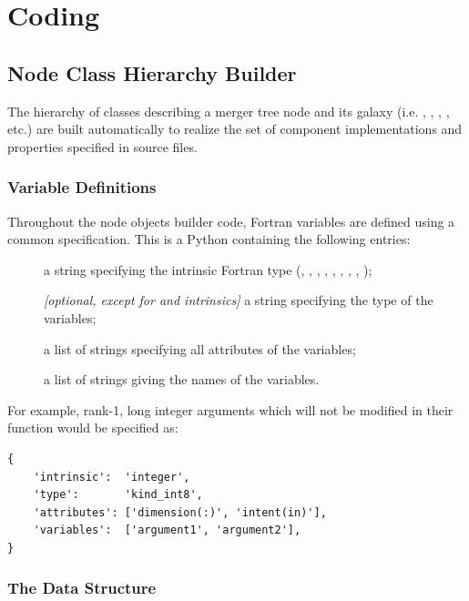 \chapter{Coding \glc}\label{sec:coding}

\section{Node Class Hierarchy Builder}

The hierarchy of classes describing a merger tree node and its galaxy (i.e. , , , , etc.) are built automatically to realize the set of component implementations and properties specified in source files.

\subsection{Variable Definitions}\label{sec:nodeBuilderVariableDefinitions}

Throughout the node objects builder code, Fortran variables are defined using a common specification. This is a Python  containing the following entries:
\begin{description}
  \item[] a string specifying the intrinsic Fortran type (, , , , , , , , );
  \item[] \emph{[optional, except for  and  intrinsics]} a string specifying the type of the variables;
  \item[] a list of strings specifying all attributes of the variables;
  \item[] a list of strings giving the names of the variables.
\end{description}
For example, rank-1, long integer arguments which will not be modified in their function would be specified as:
\begin{verbatim}
{
    'intrinsic':  'integer',
    'type':       'kind_int8',
    'attributes': ['dimension(:)', 'intent(in)'],
    'variables':  ['argument1', 'argument2'],
}
\end{verbatim}

\subsection{The  Data Structure}

